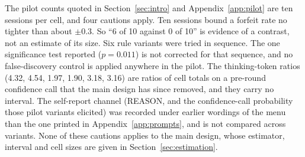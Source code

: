 The pilot counts quoted in Section~\ref{sec:intro} and Appendix~\ref{app:pilot} are ten sessions per cell, and four cautions apply. Ten sessions bound a forfeit rate no tighter than about $\pm 0.3$. So ``6 of 10 against 0 of 10'' is evidence of a contrast, not an estimate of its size. Six rule variants were tried in sequence. The one significance test reported ($p = 0.011$) is not corrected for that sequence, and no false-discovery control is applied anywhere in the pilot. The thinking-token ratios (4.32, 4.54, 1.97, 1.90, 3.18, 3.16) are ratios of cell totals on a pre-round confidence call that the main design has since removed, and they carry no interval. The self-report channel (REASON, and the confidence-call probability those pilot variants elicited) was recorded under earlier wordings of the menu than the one printed in Appendix~\ref{app:prompts}, and is not compared across variants. None of these cautions applies to the main design, whose estimator, interval and cell sizes are given in Section~\ref{sec:estimation}.

